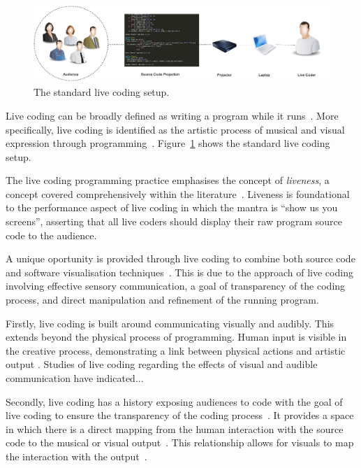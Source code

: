 \begin{figure}
\centering
\includegraphics[width=1.0\textwidth]{../images/live-coding-setup.pdf}
\caption{The standard live coding setup.}
\label{fig:live-coding-setup}
\end{figure}

Live coding can be broadly defined as writing a program while it runs~\cite{Ward2004}. More specifically, live coding is identified as the artistic process of musical and visual expression through programming~\cite{Collins2003}. Figure~\ref{fig:live-coding-setup} shows the standard live coding setup.

The live coding programming practice emphasises the concept of \emph{liveness}, a concept covered comprehensively within the literature~\cite{Auslander,Masura2007}. Liveness is foundational to the performance aspect of live coding in which the mantra is ``show us you screens'', asserting that all live coders should display their raw program source code to the audience.

A unique oportunity is provided through live coding to combine both source code and software visualisation techniques~\cite{McLean2010a}. This is due to the approach of live coding involving effective sensory communication, a goal of transparency of the coding process, and direct manipulation and refinement of the running program.

Firstly, live coding is built around communicating visually and audibly. This extends beyond the physical process of programming. Human input is visible in the creative process, demonstrating a link between physical actions and artistic output \cite{Mclean}. Studies of live coding regarding the effects of visual and audible communication have indicated...

Secondly, live coding has a history exposing audiences to code with the goal of live coding to ensure the transparency of the coding process~\cite{Collins2011,McLean2010a}. It provides a space in which there is a direct mapping from the human interaction with the source code to the musical or visual output~\cite{Mclean}. This relationship allows for visuals to map the interaction with the output~.

